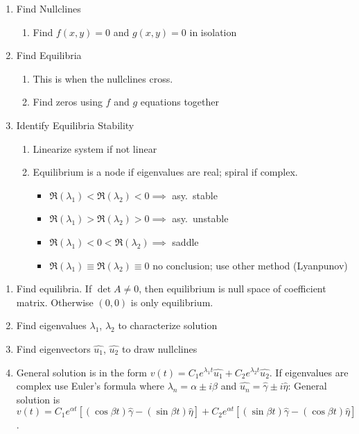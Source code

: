 \item[Two-Dimensional Nonlinear Systems] \hfill
  \begin{enumerate}
  \item Find Nullclines
    \begin{enumerate}
    \item Find $f(x,y)=0$ and $g(x,y)=0$ in isolation
    \end{enumerate}
  \item Find Equilibria
    \begin{enumerate}
    \item This is when the nullclines cross.
    \item Find zeros using $f$ and $g$ equations together
    \end{enumerate}
  \item Identify Equilibria Stability
    \begin{enumerate}
    \item Linearize system if not linear
    \item Equilibrium is a node if eigenvalues are real; spiral if complex.
      \begin{itemize}
      \item $\Re(\lambda_1) < \Re(\lambda_2) < 0 \implies$ asy.\ stable
      \item $\Re(\lambda_1) > \Re(\lambda_2) > 0 \implies$ asy.\ unstable
      \item $\Re(\lambda_1) < 0 < \Re(\lambda_2) \implies$ saddle
      \item $\Re(\lambda_1) \equiv \Re(\lambda_2) \equiv 0$ no conclusion; use
        other method (Lyanpunov)
      \end{itemize}
    \end{enumerate}
  \end{enumerate}

\item[Two-Dimensional Linear Systems] \hfill
  \begin{enumerate}
  \item Find equilibria. If $\det A\ne0$, then equilibrium is null space of
    coefficient matrix. Otherwise $(0,0)$ is only equilibrium.
  \item Find eigenvalues $\lambda_1$, $\lambda_2$ to characterize solution
  \item Find eigenvectors $\hat{u_1}$, $\hat{u_2}$ to draw nullclines
  \item General solution is in the form $v(t)=C_1e^{\lambda_1
      t}\hat{u_1}+C_2e^{\lambda_2 t}\hat{u_2}$. If eigenvalues are complex use
    Euler's formula where $\lambda_n=\alpha\pm i\beta$ and
    $\hat{u_n}=\hat{\gamma}\pm i\hat{\eta}$: General solution is $v(t) =
    C_1e^{\alpha t}[(\cos\beta t)\hat{\gamma} - (\sin\beta t)\hat{\eta}] +
    C_2e^{\alpha t}[(\sin\beta t)\hat{\gamma} - (\cos\beta t)\hat{\eta}]$.
  \end{enumerate}
